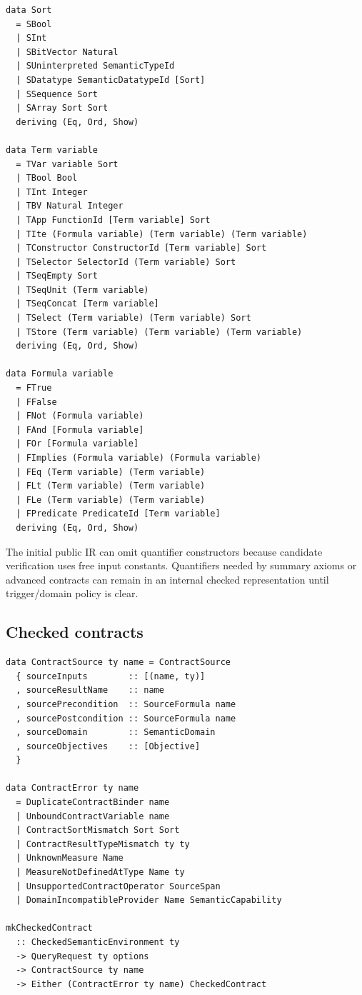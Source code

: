 \documentclass[11pt,oneside]{article}
\begin{document}
\begin{lstlisting}[language=HaskellExt]
data Sort
  = SBool
  | SInt
  | SBitVector Natural
  | SUninterpreted SemanticTypeId
  | SDatatype SemanticDatatypeId [Sort]
  | SSequence Sort
  | SArray Sort Sort
  deriving (Eq, Ord, Show)

data Term variable
  = TVar variable Sort
  | TBool Bool
  | TInt Integer
  | TBV Natural Integer
  | TApp FunctionId [Term variable] Sort
  | TIte (Formula variable) (Term variable) (Term variable)
  | TConstructor ConstructorId [Term variable] Sort
  | TSelector SelectorId (Term variable) Sort
  | TSeqEmpty Sort
  | TSeqUnit (Term variable)
  | TSeqConcat [Term variable]
  | TSelect (Term variable) (Term variable) Sort
  | TStore (Term variable) (Term variable) (Term variable)
  deriving (Eq, Ord, Show)

data Formula variable
  = FTrue
  | FFalse
  | FNot (Formula variable)
  | FAnd [Formula variable]
  | FOr [Formula variable]
  | FImplies (Formula variable) (Formula variable)
  | FEq (Term variable) (Term variable)
  | FLt (Term variable) (Term variable)
  | FLe (Term variable) (Term variable)
  | FPredicate PredicateId [Term variable]
  deriving (Eq, Ord, Show)
\end{lstlisting}

The initial public IR can omit quantifier constructors because candidate verification
uses free input constants. Quantifiers needed by summary axioms or advanced contracts
can remain in an internal checked representation until trigger/domain policy is clear.

\subsection{Checked contracts}

\begin{lstlisting}[language=HaskellExt]
data ContractSource ty name = ContractSource
  { sourceInputs        :: [(name, ty)]
  , sourceResultName    :: name
  , sourcePrecondition  :: SourceFormula name
  , sourcePostcondition :: SourceFormula name
  , sourceDomain        :: SemanticDomain
  , sourceObjectives    :: [Objective]
  }

data ContractError ty name
  = DuplicateContractBinder name
  | UnboundContractVariable name
  | ContractSortMismatch Sort Sort
  | ContractResultTypeMismatch ty ty
  | UnknownMeasure Name
  | MeasureNotDefinedAtType Name ty
  | UnsupportedContractOperator SourceSpan
  | DomainIncompatibleProvider Name SemanticCapability

mkCheckedContract
  :: CheckedSemanticEnvironment ty
  -> QueryRequest ty options
  -> ContractSource ty name
  -> Either (ContractError ty name) CheckedContract
\end{lstlisting}
\end{document}
